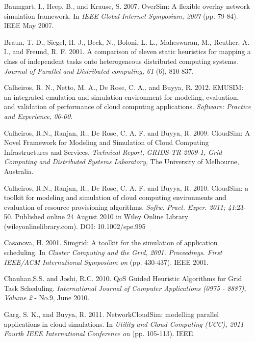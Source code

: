 \documentclass{llncs}
\begin{document}
\begin{thebibliography}{1}


Baumgart, I., Heep, B., and Krause, S. 2007. OverSim: A flexible overlay network simulation framework. In {\em IEEE Global Internet Symposium, 2007} (pp. 79-84). IEEE May 2007.

 Braun, T. D., Siegel, H. J., Beck, N., Boloni, L. L., Maheswaran, M., Reuther, A. I., and Freund, R. F. 2001. A comparison of eleven static heuristics for mapping a class of independent tasks onto heterogeneous distributed computing systems. {\em Journal of Parallel and Distributed computing, 61} (6), 810-837.

 Calheiros, R. N., Netto, M. A., De Rose, C. A., and Buyya, R. 2012. EMUSIM: an integrated emulation and simulation environment for modeling, evaluation, and validation of performance of cloud computing applications. {\em Software: Practice and Experience, 00-00}.

 Calheiros, R.N., Ranjan, R., De Rose, C. A. F. and Buyya, R. 2009. CloudSim: A Novel Framework for Modeling and Simulation of Cloud Computing Infrastructures and Services, {\em Technical Report, GRIDS-TR-2009-1, Grid Computing and Distributed Systems Laboratory,} The University of Melbourne, Australia.

 Calheiros, R.N., Ranjan, R., De Rose, C. A. F. and Buyya, R. 2010. CloudSim: a toolkit for modeling and simulation of cloud computing environments and evaluation of resource provisioning algorithms. {\em Softw. Pract. Exper. 2011; 41}:23-50. Published online 24 August 2010 in Wiley Online Library (wileyonlinelibrary.com). DOI: 10.1002/spe.995

Casanova, H. 2001. Simgrid: A toolkit for the simulation of application scheduling. In {\em Cluster Computing and the Grid, 2001. Proceedings. First IEEE/ACM International Symposium on} (pp. 430-437). IEEE 2001.

 Chauhan,S.S. and Joshi, R.C. 2010. QoS Guided Heuristic Algorithms for Grid Task Scheduling. {\em International Journal of Computer Applications (0975 - 8887), Volume 2} - No.9, June 2010.

 Garg, S. K., and Buyya, R. 2011. NetworkCloudSim: modelling parallel applications in cloud simulations. In {\em Utility and Cloud Computing (UCC), 2011 Fourth IEEE International Conference on} (pp. 105-113). IEEE.


\end{thebibliography}
\end{document}
